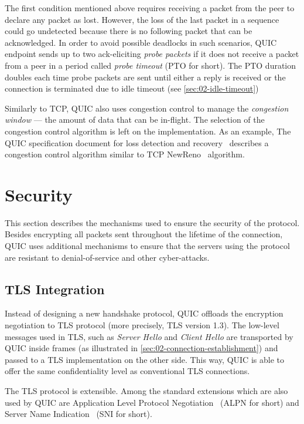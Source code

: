 The first condition mentioned above requires receiving a packet from the peer to declare any packet
as lost. However, the loss of the last packet in a sequence could go undetected because there is no
following packet that can be acknowledged. In order to avoid possible deadlocks in such scenarios,
QUIC endpoint sends up to two ack-eliciting \textit{probe packets} if it does not receive a packet
from a peer in a period called \textit{probe timeout} (PTO for short). The PTO duration doubles each
time probe packets are sent until either a reply is received or the connection is terminated due to
idle timeout (see \autoref{sec:02-idle-timeout})

Similarly to TCP, QUIC also uses congestion control to manage the \textit{congestion window} --- the
amount of data that can be in-flight. The selection of the congestion control algorithm is left on
the implementation. As an example, The QUIC specification document for loss detection and
recovery~\cite[Section~7]{draft-ietf-quic-recovery} describes a congestion control algorithm similar
to TCP NewReno~\cite{rfc6582} algorithm.

\section{Security}

This section describes the mechanisms used to ensure the security of the protocol. Besides
encrypting all packets sent throughout the lifetime of the connection, QUIC uses additional
mechanisms to ensure that the servers using the protocol are resistant to denial-of-service and
other cyber-attacks.

\subsection{TLS Integration}

Instead of designing a new handshake protocol, QUIC offloads the encryption negotiation to TLS
protocol (more precisely, TLS version 1.3). The low-level messages used in TLS, such as
\textit{Server Hello} and \textit{Client Hello} are transported by QUIC inside \CRYPTO{} frames (as
illustrated in \autoref{sec:02-connection-establishment}) and passed to a TLS implementation on the
other side. This way, QUIC is able to offer the same confidentiality level as conventional TLS
connections.

The TLS protocol is extensible. Among the standard extensions which are also used by QUIC are
Application Level Protocol  Negotiation~\cite{rfc7301} (ALPN for short) and Server
Name Indication~\cite{rfc6066} (SNI for short).

